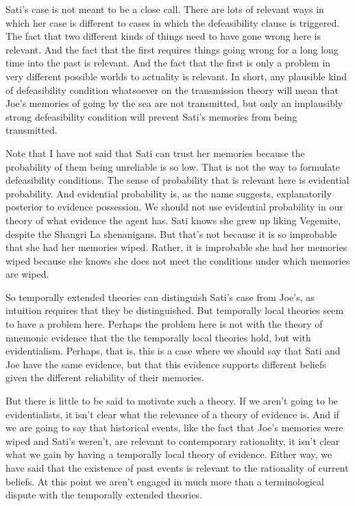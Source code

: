 \documentclass[
  10pt,
  letterpaper,
  DIV=11,
  numbers=noendperiod,
  twoside]{scrartcl}
\begin{document}
Sati's case is not meant to be a close call. There are lots of relevant
ways in which her case is different to cases in which the defeasibility
clause is triggered. The fact that two different kinds of things need to
have gone wrong here is relevant. And the fact that the first requires
things going wrong for a long long time into the past is relevant. And
the fact that the first is only a problem in very different possible
worlds to actuality is relevant. In short, any plausible kind of
defeasibility condition whatsoever on the transmission theory will mean
that Joe's memories of going by the sea are not transmitted, but only an
implausibly strong defeasibility condition will prevent Sati's memories
from being transmitted.

Note that I have not said that Sati can trust her memories because the
probability of them being unreliable is so low. That is not the way to
formulate defeasibility conditions. The sense of probability that is
relevant here is evidential probability. And evidential probability is,
as the name suggests, explanatorily posterior to evidence possession. We
should not use evidential probability in our theory of what evidence the
agent has. Sati knows she grew up liking Vegemite, despite the Shangri
La shenanigans. But that's not because it is so improbable that she had
her memories wiped. Rather, it is improbable she had her memories wiped
because she knows she does not meet the conditions under which memories
are wiped.

So temporally extended theories can distinguish Sati's case from Joe's,
as intuition requires that they be distinguished. But temporally local
theories seem to have a problem here. Perhaps the problem here is not
with the theory of mnemonic evidence that the the temporally local
theories hold, but with evidentialism. Perhaps, that is, this is a case
where we should say that Sati and Joe have the same evidence, but that
this evidence supports different beliefs given the different reliability
of their memories.

But there is little to be said to motivate such a theory. If we aren't
going to be evidentialists, it isn't clear what the relevance of a
theory of evidence is. And if we are going to say that historical
events, like the fact that Joe's memories were wiped and Sati's weren't,
are relevant to contemporary rationality, it isn't clear what we gain by
having a temporally local theory of evidence. Either way, we have said
that the existence of past events is relevant to the rationality of
current beliefs. At this point we aren't engaged in much more than a
terminological dispute with the temporally extended theories.
\end{document}
